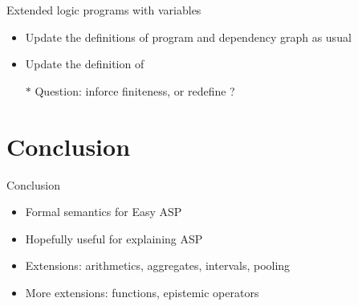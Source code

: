 \begin{frame}{Extended logic programs \alert{with variables}}
  \vfill
  \begin{itemize}
    \item Update the definitions of program and dependency graph as usual
    \bigskip
    \item \alert{Update the definition of }
    \bigskip
  \item[$*$] Question: inforce finiteness, or redefine ? 
  \end{itemize}
  \vfill 
\end{frame}





\section{Conclusion}

\begin{frame}{Conclusion}
\vfill
\begin{itemize}
\item Formal semantics for Easy ASP
\bigskip
\item Hopefully useful for explaining ASP
\bigskip
\item Extensions: arithmetics, aggregates, intervals, pooling
\bigskip
\item More extensions: functions, epistemic operators
\end{itemize}
\vfill
\end{frame}

